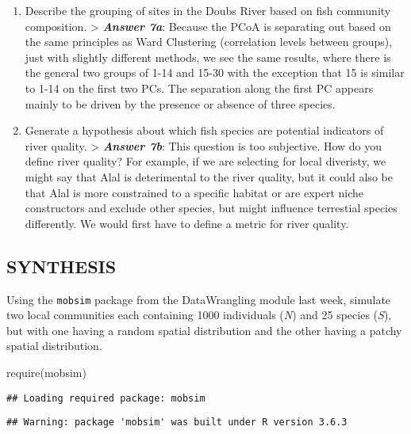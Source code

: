 \documentclass[
]{article}
\newenvironment{Shaded}{\begin{snugshade}}{\end{snugshade}}
\newcommand{\FunctionTok}[1]{\textcolor[rgb]{0.00,0.00,0.00}{#1}}
\newcommand{\NormalTok}[1]{#1}
\begin{document}
\begin{enumerate}
\def\labelenumi{\alph{enumi}.}
\item
  Describe the grouping of sites in the Doubs River based on fish
  community composition. \textgreater{} \textbf{\emph{Answer 7a}}:
  Because the PCoA is separating out based on the same principles as
  Ward Clustering (correlation levels between groups), just with
  slightly different methods, we see the same results, where there is
  the general two groups of 1-14 and 15-30 with the exception that 15 is
  similar to 1-14 on the first two PCs. The separation along the first
  PC appears mainly to be driven by the presence or absence of three
  species.
\item
  Generate a hypothesis about which fish species are potential
  indicators of river quality. \textgreater{} \textbf{\emph{Answer 7b}}:
  This question is too subjective. How do you define river quality? For
  example, if we are selecting for local diveristy, we might say that
  Alal is deterimental to the river quality, but it could also be that
  Alal is more constrained to a specific habitat or are expert niche
  constructors and exclude other species, but might influence terrestial
  species differently. We would first have to define a metric for river
  quality.
\end{enumerate}

\hypertarget{synthesis}{%
\subsection{SYNTHESIS}\label{synthesis}}

Using the \texttt{mobsim} package from the DataWrangling module last
week, simulate two local communities each containing 1000 individuals
(\emph{N}) and 25 species (\emph{S}), but with one having a random
spatial distribution and the other having a patchy spatial distribution.

\begin{Shaded}
\begin{Highlighting}[]
\FunctionTok{require}\NormalTok{(mobsim)}
\end{Highlighting}
\end{Shaded}

\begin{verbatim}
## Loading required package: mobsim
\end{verbatim}

\begin{verbatim}
## Warning: package 'mobsim' was built under R version 3.6.3
\end{verbatim}
\end{document}
